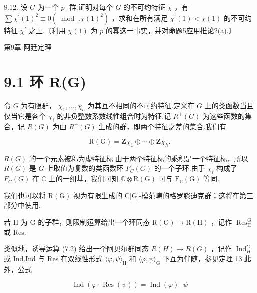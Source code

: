 \documentclass[10pt]{article}
\begin{document}
8.12. 设 \(G\) 为一个 \(p\) -群.证明对每个 \(G\) 的不可约特征 \(\chi\) ，有 \(\sum {\chi }^{\prime }{\left( 1\right) }^{2} \equiv  0\left( {{\;\operatorname{mod}\;.}\chi {\left( 1\right) }^{2}}\right)\) ，求和在所有满足 \({\chi }^{\prime }\left( 1\right)  < \chi \left( 1\right)\) 的不可约特征 \({\chi }^{\prime }\) 之上.〔利用 \(\chi \left( 1\right)\) 为 \(p\) 的幂这一事实，并对命题5应用推论2(a).〕

第9章 阿廷定理

\section*{9.1 环 R(G)}

令 \(G\) 为有限群， \({\chi }_{1},\ldots ,{\chi }_{h}\) 为其互不相同的不可约特征.定义在 \(G\) 上的类函数当且仅当它是各个 \({\chi }_{i}\) 的非负整数系数线性组合时为特征.记 \({R}^{ + }\left( G\right)\) 为这些函数的集合，记 \(R\left( G\right)\) 为由 \({R}^{ + }\left( G\right)\) 生成的群，即两个特征之差的集合.我们有

\[
\mathrm{R}\left( \mathrm{G}\right)  = \mathbf{Z}{\chi }_{1} \oplus  \cdots  \oplus  \mathbf{Z}{\chi }_{h}.
\]

\(R\left( G\right)\) 的一个元素被称为虚特征标.由于两个特征标的乘积是一个特征标，所以 \(R\left( G\right)\) 是 \(G\) 上取值为复数的类函数环 \({F}_{C}\left( G\right)\) 的一个子环.由于 \({\chi }_{i}\) 构成了 \({F}_{C}\left( G\right)\) 在 \(\mathbb{C}\) 上的一组基，我们可知 \(\mathbb{C} \otimes  \mathrm{R}\left( \mathrm{G}\right)\) 可与 \({\mathrm{F}}_{\mathbb{C}}\left( \mathrm{G}\right)\) 等同.

我们也可以将 \(\mathrm{R}\left( \mathrm{G}\right)\) 视为有限生成的 C[G]-模范畴的格罗滕迪克群；这将在第三部分中使用.

若 \(\mathrm{H}\) 为 \(\mathrm{G}\) 的子群，则限制运算给出一个环同态 \(\mathrm{R}\left( \mathrm{G}\right)  \rightarrow  \mathrm{R}\left( \mathrm{H}\right)\) ，记作 \({\operatorname{Res}}_{\mathrm{H}}^{\mathrm{G}}\) 或 Res.

类似地，诱导运算 (7.2) 给出一个阿贝尔群同态 \(R\left( H\right)  \rightarrow  R\left( G\right)\) ，记作 \({\operatorname{Ind}}_{H}^{G}\) 或 Ind.Ind 与 Res 在双线性形式 \(\langle \varphi ,\psi {\rangle }_{\mathrm{H}}\) 和 \(\langle \varphi ,\psi {\rangle }_{\mathrm{G}}\) 下互为伴随，参见定理 13.此外，公式

\[
\operatorname{Ind}\left( {\varphi  \cdot  \operatorname{Res}\left( \psi \right) }\right)  = \operatorname{Ind}\left( \varphi \right)  \cdot  \psi
\]
\end{document}
